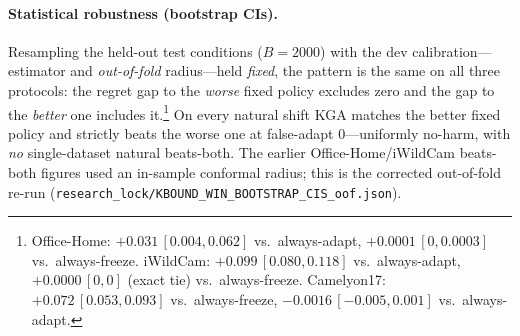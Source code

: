 \documentclass[conference]{IEEEtran}
\theoremstyle{plain}
\theoremstyle{definition}
\theoremstyle{remark}
\begin{document}
\begin{table}[t]\centering\small
\caption{Office-Home Protocol~M v2: dev-locked \texttt{sar\_online\_aggressive}, target-test ($n{=}35$).}
\label{tab:officehome-M}
\end{table}

\paragraph{Statistical robustness (bootstrap CIs).}
Resampling the held-out test conditions ($B{=}2000$) with the dev calibration---estimator and
\emph{out-of-fold} radius---held \emph{fixed}, the pattern is the same on all three protocols: the
regret gap to the \emph{worse} fixed policy excludes zero and the gap to the \emph{better} one
includes it.\footnote{Office-Home: $+0.031\,[0.004,0.062]$ vs.\ always-adapt,
$+0.0001\,[0,0.0003]$ vs.\ always-freeze. iWildCam: $+0.099\,[0.080,0.118]$ vs.\ always-adapt,
$+0.0000\,[0,0]$ (exact tie) vs.\ always-freeze. Camelyon17: $+0.072\,[0.053,0.093]$ vs.\
always-freeze, $-0.0016\,[-0.005,0.001]$ vs.\ always-adapt.} On every natural shift \textsc{KGA}
matches the better fixed policy and strictly beats the worse one at false-adapt $0$---uniformly
no-harm, with \emph{no} single-dataset natural beats-both. The earlier Office-Home/iWildCam
beats-both figures used an in-sample conformal radius; this is the corrected out-of-fold re-run
(\texttt{research\_lock/KBOUND\_WIN\_BOOTSTRAP\_CIS\_oof.json}).
\end{document}
